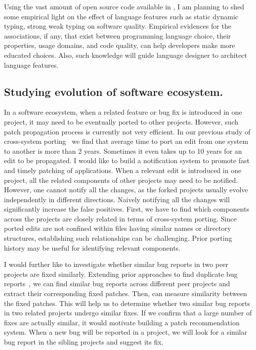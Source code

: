 \documentclass[a4paper, 11pt]{article}
\begin{document}
\begin{small}
Using the vast amount of open source code available  in \gh, I am planning to shed some empirical light 
on the effect of language features such as static \vs dynamic typing, strong \vs weak typing on software quality. 
Empirical evidences for the associations,  if any,  that exist between programming language
choice, their properties, usage domains, and code quality, can help developers make more
educated choices. Also, such knowledge will guide language designer to architect language features.


\subsection*{\small Studying evolution of software ecosystem.}

In a software ecosystem, when a related feature or bug fix is introduced in one project, it may need to be eventually ported to other projects.
However, such patch propagation process is currently not very efficient. In our previous study of cross-system porting~\cite{Ray2012} we find that average time to port an edit from one system to another is more than 2 years. Sometimes it even takes up to 10 years for an edit to be propagated.
I would like to build a notification system to promote fast and timely patching of applications. When a relevant edit is introduced in one project, all the related components of other projects may need to be notified. However, one cannot notify all the changes, as the forked projects usually evolve independently in different directions. Naively notifying all the changes will significantly increase the false positives. First, we have to find which components across the projects are closely related in terms of cross-system porting. Since ported edits are not confined within files having similar names or directory structures, establishing such relationships can be challenging. Prior porting history may be useful for identifying relevant components. 

I would further like to investigate whether similar bug reports in two peer projects are fixed similarly. 
Extending prior approaches to find duplicate bug reports~\cite{dupBugReport:Wang:ICSE2008,dupBugReport:Nguyen:ASE2012}, 
we can find similar bug reports across different peer projects and extract their corresponding fixed patches. 
Then, {\rep} can measure similarity between the fixed patches. This will help us to determine whether two similar bug reports in two related projects undergo similar fixes. If we confirm that a large number of fixes are actually similar, it would motivate building a patch recommendation system. When a new bug will be reported in a project, we will look for a similar bug report in the  sibling projects and suggest its fix. 


\end{small}
\end{document}
